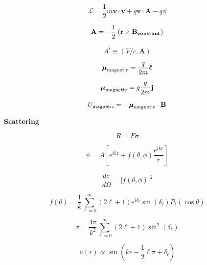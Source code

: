 \documentclass[11pt]{article}
\newcommand{\Lagr}{\mathcal{L}}
\newcommand{\vect}[1]{\boldsymbol{\mathbf{#1}}}
\begin{document}
\begin{multicols}{2}
\begin{equation}
\Lagr = \frac{1}{2} m \vect{v} \cdot \vect{v} + q \vect{v} \cdot \vect{A} - q \phi
\end{equation}

\begin{equation}
\vect{A} = - \frac{1}{2} \: (\vect{r} \times \vect{B_{\rm constant}})
\end{equation}

\begin{equation}
A^{i} \equiv (V/c,\vect{A})
\end{equation}

\begin{equation}
\vect{\mu}_{\rm magnetic} = \frac{q}{2m} \vect{\ell}
\end{equation}

\begin{equation}
\vect{\mu}_{\rm magnetic} = g \frac{q}{2m} \vect{j}
\end{equation}

\begin{equation}
U_{\rm magnetic} = - \vect{\mu}_{\rm magnetic} \cdot \vect{B}
\end{equation}

{\bf Scattering}

\begin{equation}
R = F \sigma
\end{equation}

\begin{equation}
\psi = A \left [
         e^{ikz} + f(\theta,\phi) \frac{e^{ikr}}{r}
         \right ]
\end{equation}

\begin{equation}
\frac{d \sigma}{d \Omega} = |f(\theta,\phi)|^2
\end{equation}

\begin{equation}
f(\theta) = \frac{1}{k} \sum_{\ell=0}^{\infty}
            (2\ell+1) e^{i\delta_{\ell}} \sin(\delta_{\ell})
            P_{\ell}(\cos \theta)
\end{equation}

\begin{equation}
\sigma = \frac{4\pi}{k^2} \sum_{\ell = 0}^{\infty} (2\ell+1)
         \sin ^2(\delta_{\ell})
\end{equation}

\begin{equation}
u(r) \propto \sin \left( kr - \frac{1}{2}\ell\pi+\delta_{\ell}
                  \right)
\end{equation}


\end{multicols}
\end{document}
